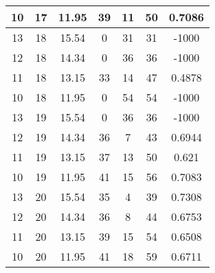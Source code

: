 \documentclass[letterpaper, 12pt]{article}
\begin{document}
\begin{longtable}{|c|c|c|c|c|c|c|}
10 & 17 & 11.95 & 39 & 11 & 50 & 0.7086 \\
\hline
13 & 18 & 15.54 & 0 & 31 & 31 & -1000 \\
\hline
12 & 18 & 14.34 & 0 & 36 & 36 & -1000 \\
\hline
11 & 18 & 13.15 & 33 & 14 & 47 & 0.4878 \\
\hline
10 & 18 & 11.95 & 0 & 54 & 54 & -1000 \\
\hline
13 & 19 & 15.54 & 0 & 36 & 36 & -1000 \\
\hline
12 & 19 & 14.34 & 36 & 7 & 43 & 0.6944 \\
\hline
11 & 19 & 13.15 & 37 & 13 & 50 & 0.621 \\
\hline
10 & 19 & 11.95 & 41 & 15 & 56 & 0.7083 \\
\hline
13 & 20 & 15.54 & 35 & 4 & 39 & 0.7308 \\
\hline
12 & 20 & 14.34 & 36 & 8 & 44 & 0.6753 \\
\hline
11 & 20 & 13.15 & 39 & 15 & 54 & 0.6508 \\
\hline
10 & 20 & 11.95 & 41 & 18 & 59 & 0.6711 \\
\hline
\end{longtable}
\end{document}
